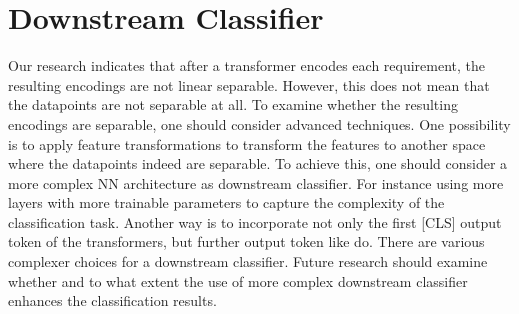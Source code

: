 \section{Downstream Classifier}
\label{chp:future_work:sec:downstream_classifier}
Our research indicates that after a transformer encodes each requirement, the resulting encodings are not linear separable.
However, this does not mean that the datapoints are not separable at all.
To examine whether the resulting encodings are separable, one should consider advanced techniques.
One possibility is to apply feature transformations to transform the features to another space where the datapoints indeed are separable.
To achieve this, one should consider a more complex \ac{NN} architecture as downstream classifier.
For instance using more layers with more trainable parameters to capture the complexity of the classification task.
Another way is to incorporate not only the first [CLS] output token of the transformers, but further output token like \textcite{Gao:2019} do.
There are various complexer choices for a downstream classifier.
Future research should examine whether and to what extent the use of more complex downstream classifier enhances the classification results.
